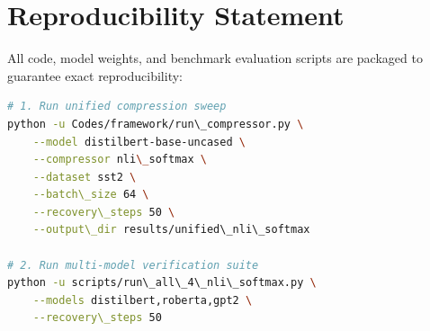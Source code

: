 \section{Reproducibility Statement}
All code, model weights, and benchmark evaluation scripts are packaged to guarantee exact reproducibility:
\begin{lstlisting}[language=bash]
# 1. Run unified compression sweep
python -u Codes/framework/run\_compressor.py \
    --model distilbert-base-uncased \
    --compressor nli\_softmax \
    --dataset sst2 \
    --batch\_size 64 \
    --recovery\_steps 50 \
    --output\_dir results/unified\_nli\_softmax

# 2. Run multi-model verification suite
python -u scripts/run\_all\_4\_nli\_softmax.py \
    --models distilbert,roberta,gpt2 \
    --recovery\_steps 50
\end{lstlisting}
